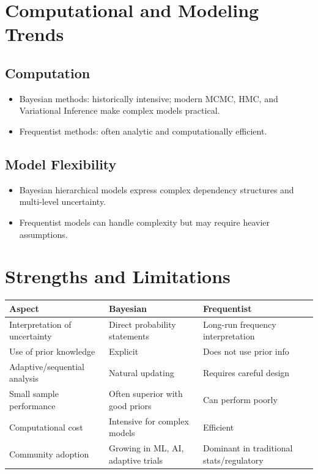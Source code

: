 \documentclass[12pt]{article}
\begin{document}
\section{Computational and Modeling Trends}

\subsection{Computation}
\begin{itemize}
    \item Bayesian methods: historically intensive; modern MCMC, HMC, and Variational Inference make complex models practical.
    \item Frequentist methods: often analytic and computationally efficient.
\end{itemize}

\subsection{Model Flexibility}
\begin{itemize}
    \item Bayesian hierarchical models express complex dependency structures and multi-level uncertainty.
    \item Frequentist models can handle complexity but may require heavier assumptions.
\end{itemize}

\section{Strengths and Limitations}

\begin{tabular}{|l|l|l|}
\hline
Aspect & Bayesian & Frequentist \\
\hline
Interpretation of uncertainty & Direct probability statements & Long-run frequency interpretation \\
Use of prior knowledge & Explicit & Does not use prior info \\
Adaptive/sequential analysis & Natural updating & Requires careful design \\
Small sample performance & Often superior with good priors & Can perform poorly \\
Computational cost & Intensive for complex models & Efficient \\
Community adoption & Growing in ML, AI, adaptive trials & Dominant in traditional stats/regulatory \\
\hline
\end{tabular}
\end{document}
